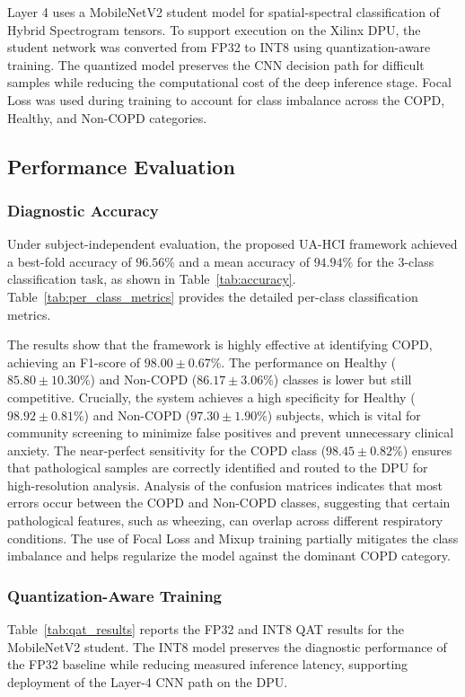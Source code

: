 Layer 4 uses a MobileNetV2 student model for spatial-spectral classification of Hybrid Spectrogram tensors. To support execution on the Xilinx DPU, the student network was converted from FP32 to INT8 using quantization-aware training. The quantized model preserves the CNN decision path for difficult samples while reducing the computational cost of the deep inference stage. Focal Loss was used during training to account for class imbalance across the COPD, Healthy, and Non-COPD categories.

\subsection{Performance Evaluation}
\subsubsection{Diagnostic Accuracy}
Under subject-independent evaluation, the proposed UA-HCI framework achieved a best-fold accuracy of $96.56\%$ and a mean accuracy of $94.94\%$ for the 3-class classification task, as shown in Table~\ref{tab:accuracy}. Table~\ref{tab:per_class_metrics} provides the detailed per-class classification metrics. 

The results show that the framework is highly effective at identifying COPD, achieving an F1-score of $98.00 \pm 0.67\%$. The performance on Healthy ($85.80 \pm 10.30\%$) and Non-COPD ($86.17 \pm 3.06\%$) classes is lower but still competitive. Crucially, the system achieves a high specificity for Healthy ($98.92 \pm 0.81\%$) and Non-COPD ($97.30 \pm 1.90\%$) subjects, which is vital for community screening to minimize false positives and prevent unnecessary clinical anxiety. The near-perfect sensitivity for the COPD class ($98.45 \pm 0.82\%$) ensures that pathological samples are correctly identified and routed to the DPU for high-resolution analysis. Analysis of the confusion matrices indicates that most errors occur between the COPD and Non-COPD classes, suggesting that certain pathological features, such as wheezing, can overlap across different respiratory conditions. The use of Focal Loss and Mixup training partially mitigates the class imbalance and helps regularize the model against the dominant COPD category.



\subsubsection{Quantization-Aware Training}
Table~\ref{tab:qat_results} reports the FP32 and INT8 QAT results for the MobileNetV2 student. The INT8 model preserves the diagnostic performance of the FP32 baseline while reducing measured inference latency, supporting deployment of the Layer-4 CNN path on the DPU.

